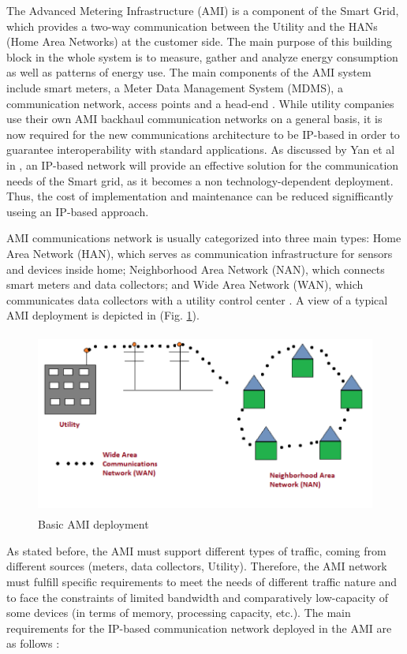 \documentclass[11pt,final,onecolumn]{IEEEtran}
\begin{document}
The Advanced Metering Infrastructure (AMI) is a component of the Smart Grid, which provides a two-way communication between the Utility and the HANs (Home Area Networks) at the customer side. The main purpose of this building block in the whole system is to measure, gather and analyze energy consumption as well as patterns of energy use. The main components of the AMI system include smart meters, a Meter Data Management System (MDMS), a communication network, access points and a head-end  \cite{Wang2011b} \cite{Bennett2008}. While utility companies use their own AMI backhaul communication networks on a general basis, it is now required for the new communications architecture to be IP-based in order to guarantee interoperability with standard applications. As discussed by Yan et al in \cite{Yan2013}, an IP-based network will provide an effective solution for the communication needs of the Smart grid, as it becomes a non technology-dependent deployment.  Thus, the cost of implementation and maintenance can be reduced signifficantly useing an IP-based approach. 

AMI communications network is usually categorized into three main types: Home Area Network (HAN), which serves as communication infrastructure for sensors and devices inside home; Neighborhood Area Network (NAN), which connects smart meters and data collectors; and Wide Area Network (WAN), which communicates data collectors with a utility control center  \cite{Tang2010}. A view of a typical AMI deployment is depicted in (Fig. \ref{fig:ami}).

\begin{figure}[h!]
\centering
\includegraphics [height=6cm] {basicAMI}
\caption{Basic AMI deployment}
\label{fig:ami}
\end{figure}

As stated before, the AMI must support different types of traffic, coming from different sources (meters, data collectors, Utility). Therefore, the AMI network must fulfill specific requirements to meet the needs of different traffic nature and to face the constraints of limited bandwidth and comparatively low-capacity of some devices (in terms of memory, processing capacity, etc.). The main requirements for the IP-based communication network deployed in the AMI are as follows  \cite{Wang2011b}:
\end{document}
